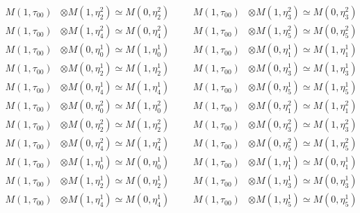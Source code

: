 \begin{align*}
M(1,\tau_{00}) &\otimes M(1,\eta^{2}_{2}) \simeq M(0,\eta^{2}_{2}) &&& M(1,\tau_{00}) &\otimes M(1,\eta^{2}_{3}) \simeq M(0,\eta^{2}_{3})\\
M(1,\tau_{00}) &\otimes M(1,\eta^{2}_{4}) \simeq M(0,\eta^{2}_{4}) &&& M(1,\tau_{00}) &\otimes M(1,\eta^{2}_{5}) \simeq M(0,\eta^{2}_{5})\\
M(1,\tau_{00}) &\otimes M(0,\eta^{1}_{0}) \simeq M(1,\eta^{1}_{0}) &&& M(1,\tau_{00}) &\otimes M(0,\eta^{1}_{1}) \simeq M(1,\eta^{1}_{1})\\
M(1,\tau_{00}) &\otimes M(0,\eta^{1}_{2}) \simeq M(1,\eta^{1}_{2}) &&& M(1,\tau_{00}) &\otimes M(0,\eta^{1}_{3}) \simeq M(1,\eta^{1}_{3})\\
M(1,\tau_{00}) &\otimes M(0,\eta^{1}_{4}) \simeq M(1,\eta^{1}_{4}) &&& M(1,\tau_{00}) &\otimes M(0,\eta^{1}_{5}) \simeq M(1,\eta^{1}_{5})\\
M(1,\tau_{00}) &\otimes M(0,\eta^{2}_{0}) \simeq M(1,\eta^{2}_{0}) &&& M(1,\tau_{00}) &\otimes M(0,\eta^{2}_{1}) \simeq M(1,\eta^{2}_{1})\\
M(1,\tau_{00}) &\otimes M(0,\eta^{2}_{2}) \simeq M(1,\eta^{2}_{2}) &&& M(1,\tau_{00}) &\otimes M(0,\eta^{2}_{3}) \simeq M(1,\eta^{2}_{3})\\
M(1,\tau_{00}) &\otimes M(0,\eta^{2}_{4}) \simeq M(1,\eta^{2}_{4}) &&& M(1,\tau_{00}) &\otimes M(0,\eta^{2}_{5}) \simeq M(1,\eta^{2}_{5})\\
M(1,\tau_{00}) &\otimes M(1,\eta^{1}_{0}) \simeq M(0,\eta^{1}_{0}) &&& M(1,\tau_{00}) &\otimes M(1,\eta^{1}_{1}) \simeq M(0,\eta^{1}_{1})\\
M(1,\tau_{00}) &\otimes M(1,\eta^{1}_{2}) \simeq M(0,\eta^{1}_{2}) &&& M(1,\tau_{00}) &\otimes M(1,\eta^{1}_{3}) \simeq M(0,\eta^{1}_{3})\\
M(1,\tau_{00}) &\otimes M(1,\eta^{1}_{4}) \simeq M(0,\eta^{1}_{4}) &&& M(1,\tau_{00}) &\otimes M(1,\eta^{1}_{5}) \simeq M(0,\eta^{1}_{5})\\
\end{align*}


